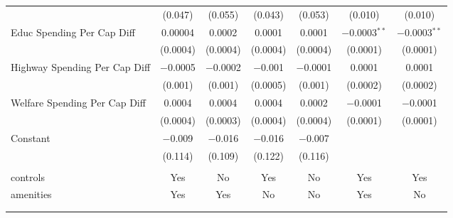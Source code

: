 \begin{table}[!htbp]
\begin{tabular}{@{\extracolsep{5pt}}lcccccc}
  & (0.047) & (0.055) & (0.043) & (0.053) & (0.010) & (0.010) \\ 
  Educ Spending Per Cap Diff & 0.00004 & 0.0002 & 0.0001 & 0.0001 & $-$0.0003$^{**}$ & $-$0.0003$^{**}$ \\ 
  & (0.0004) & (0.0004) & (0.0004) & (0.0004) & (0.0001) & (0.0001) \\ 
  Highway Spending Per Cap Diff & $-$0.0005 & $-$0.0002 & $-$0.001 & $-$0.0001 & 0.0001 & 0.0001 \\ 
  & (0.001) & (0.001) & (0.0005) & (0.001) & (0.0002) & (0.0002) \\ 
  Welfare Spending Per Cap Diff & 0.0004 & 0.0004 & 0.0004 & 0.0002 & $-$0.0001 & $-$0.0001 \\ 
  & (0.0004) & (0.0003) & (0.0004) & (0.0004) & (0.0001) & (0.0001) \\ 
  Constant & $-$0.009 & $-$0.016 & $-$0.016 & $-$0.007 &  &  \\ 
  & (0.114) & (0.109) & (0.122) & (0.116) &  &  \\ 
 \hline \\[-1.8ex] 
controls & Yes & No & Yes & No & Yes & Yes \\ 
amenities & Yes & Yes & No & No & Yes & No \\ 
\hline \\[-1.8ex] 
\hline 
\hline \\[-1.8ex] 
\end{tabular} 
\end{table} 
